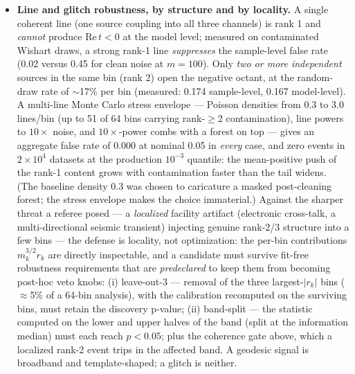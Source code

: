\documentclass[11pt]{article}
\begin{document}
\begin{itemize}
triple product (the theorem again). The gate costs sensitivity only through the matched null's wider tails, never through exclusion. \emph{What exactly is the matched bootstrap?} Predeclared here: the null ensemble is diagonal-plus-rank-1 with $|b_i b_j|$ chosen to reproduce the measured pairwise coherence magnitudes $|\hat\gamma_{ij}|$ bin by bin and the factor phases set to the $t$-\emph{positive} configuration --- the admissible covariance with maximal positive model-level $t$ at those coherences. This is a prescription, not a least-favorable theorem: its tail coverage against the full admissible class at $p < 10^{-3}$ is validated by simulation (the scan of Appendix~\ref{app:revision31} at 0.05; Section~\ref{sec:signstat} tail numbers at $10^{-3}$), with importance sampling and generalized-Pareto tail modeling as the production tools, and any band whose matched-null calibration cannot be certified at the required level simply carries no discovery weight.
\item \textbf{Line and glitch robustness, by structure and by locality.} A single coherent line (one source coupling into all three channels) is rank 1 and \emph{cannot} produce $\mathrm{Re}\,t<0$ at the model level; measured on contaminated Wishart draws, a strong rank-1 line \emph{suppresses} the sample-level false rate (0.02 versus 0.45 for clean noise at $m=100$). Only \emph{two or more independent} sources in the same bin (rank 2) open the negative octant, at the random-draw rate of $\sim$17\% per bin (measured: 0.174 sample-level, 0.167 model-level). A multi-line Monte Carlo stress envelope --- Poisson densities from 0.3 to 3.0 lines/bin (up to 51 of 64 bins carrying rank-$\ge$2 contamination), line powers to $10\times$ noise, and $10\times$-power combs with a forest on top --- gives an aggregate false rate of 0.000 at nominal 0.05 in \emph{every} case, and zero events in $2\times10^4$ datasets at the production $10^{-3}$ quantile: the mean-positive push of the rank-1 content grows with contamination faster than the tail widens. (The baseline density 0.3 was chosen to caricature a masked post-cleaning forest; the stress envelope makes the choice immaterial.) Against the sharper threat a referee posed --- a \emph{localized} facility artifact (electronic cross-talk, a multi-directional seismic transient) injecting genuine rank-2/3 structure into a few bins --- the defense is locality, not optimization: the per-bin contributions $m_k^{3/2} r_k$ are directly inspectable, and a candidate must survive fit-free robustness requirements that are \emph{predeclared} to keep them from becoming post-hoc veto knobs: (i) leave-out-3 --- removal of the three largest-$|r_k|$ bins ($\approx$5\% of a 64-bin analysis), with the calibration recomputed on the surviving bins, must retain the discovery p-value; (ii) band-split --- the statistic computed on the lower and upper halves of the band (split at the information median) must each reach $p < 0.05$; plus the coherence gate above, which a localized rank-2 event trips in the affected band. A geodesic signal is broadband and template-shaped; a glitch is neither.

\end{itemize}
\end{document}
